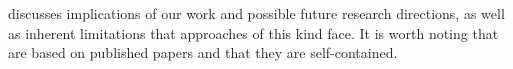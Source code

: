  	 discusses implications of our work and possible future research directions, as well as inherent limitations that approaches of this kind face. 
 	It is worth noting that  are based on published papers and that they are self-contained.
 	
 	
 	
 	
	
%	
%	
%	
